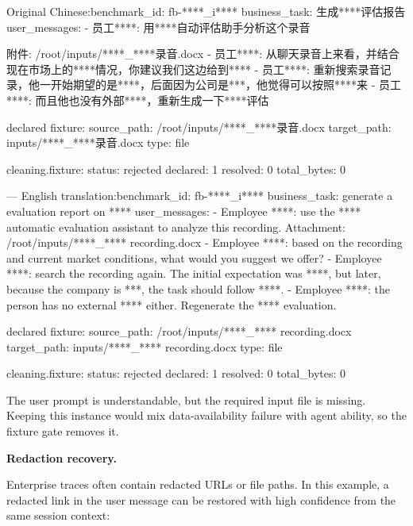 \documentclass{llmxive}
\providecommand{\caseheader}[1]{\noindent\colorbox{fbcaseblue}{\parbox{0.96\linewidth}{\bfseries #1}}\vspace{0.5mm}\newline}
\begin{document}
\begin{casebox}\scriptsize
\begin{caselines}
Original Chinese:\nopagebreak[4]
benchmark\_id: fb-****\_i****
business\_task: 生成****评估报告
user\_messages:
- 员工****: 用****自动评估助手分析这个录音

  附件: /root/inputs/****\_****录音.docx
- 员工****: 从聊天录音上来看，并结合现在市场上的****情况，你建议我们这边给到****
- 员工****: 重新搜索录音记录，他一开始期望的是****，后面因为公司是***，他觉得可以按照****来
- 员工****: 而且他也没有外部****，重新生成一下****评估

declared fixture:
  source\_path: /root/inputs/****\_****录音.docx
  target\_path: inputs/****\_****录音.docx
  type: file

cleaning.fixture:
  status: rejected
  declared: 1
  resolved: 0
  total\_bytes: 0

---
English translation:\nopagebreak[4]
benchmark\_id: fb-****\_i****
business\_task: generate a evaluation report on ****
user\_messages:
- Employee ****: use the **** automatic evaluation assistant to analyze this recording.
  Attachment: /root/inputs/****\_**** recording.docx
- Employee ****: based on the recording and current market conditions, what would you suggest we offer?
- Employee ****: search the recording again. The initial expectation was ****, but later, because the company is ***, the task should follow ****.
- Employee ****: the person has no external **** either. Regenerate the **** evaluation.

declared fixture:
  source\_path: /root/inputs/****\_**** recording.docx
  target\_path: inputs/****\_**** recording.docx
  type: file

cleaning.fixture:
  status: rejected
  declared: 1
  resolved: 0
  total\_bytes: 0
\end{caselines}
\end{casebox}

The user prompt is understandable, but the required input file is missing. Keeping this instance would mix data-availability failure with agent ability, so the fixture gate removes it.

\caseheader{Redaction recovery.}
Enterprise traces often contain redacted URLs or file paths. In this example, a redacted link in the user message can be restored with high confidence from the same session context:
\end{document}
